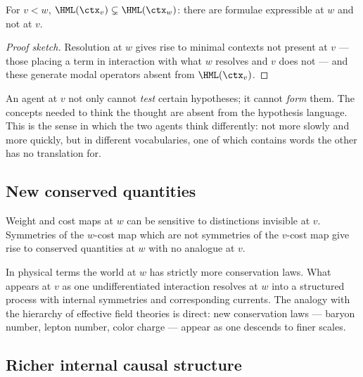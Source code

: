 \begin{proposition}
\label{prop:strict-hml}
For $v < w$, $\HML(\ctx_v) \subsetneq \HML(\ctx_w)$: there are formulae
expressible at $w$ and not at $v$.
\end{proposition}

\begin{proof}[Proof sketch]
Resolution at $w$ gives rise to minimal contexts not present at $v$ ---
those placing a term in interaction with what $w$ resolves and $v$ does
not --- and these generate modal operators absent from $\HML(\ctx_v)$.
\end{proof}

\begin{remark}
An agent at $v$ not only cannot \emph{test} certain hypotheses; it cannot
\emph{form} them.
The concepts needed to think the thought are absent from the hypothesis
language.
This is the sense in which the two agents think differently: not more
slowly and more quickly, but in different vocabularies, one of which
contains words the other has no translation for.
\end{remark}

\subsection{New conserved quantities}

\begin{proposition}
\label{prop:new-noether}
Weight and cost maps at $w$ can be sensitive to distinctions invisible at
$v$.
Symmetries of the $w$-cost map which are not symmetries of the $v$-cost
map give rise to conserved quantities at $w$ with no analogue at $v$.
\end{proposition}

\begin{remark}
In physical terms the world at $w$ has strictly more conservation laws.
What appears at $v$ as one undifferentiated interaction resolves at $w$
into a structured process with internal symmetries and corresponding
currents.
The analogy with the hierarchy of effective field theories is direct:
new conservation laws --- baryon number, lepton number, color charge ---
appear as one descends to finer scales.
\end{remark}

\subsection{Richer internal causal structure}

